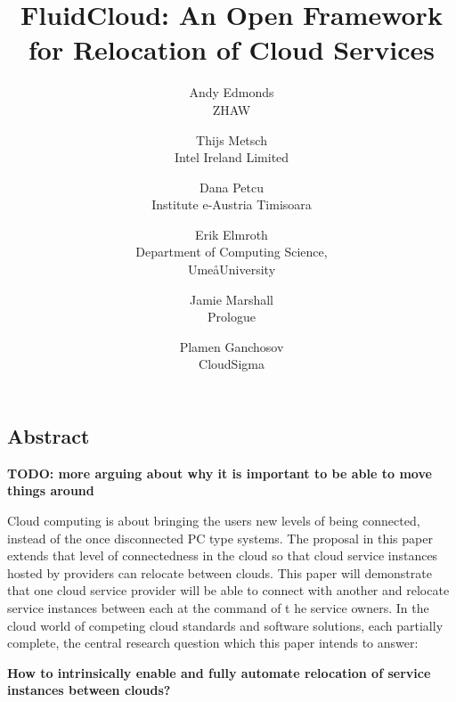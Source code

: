 \documentclass[letterpaper,twocolumn,10pt]{article}
\begin{document}
\date{}

\title{\Large \bf FluidCloud: An Open Framework for Relocation of Cloud Services}

\author{
{\rm Andy Edmonds}\\
ZHAW
\and
{\rm Thijs Metsch}\\
Intel Ireland Limited
\and
{\rm Dana Petcu}\\
Institute e-Austria Timisoara
\and
{\rm Erik Elmroth}\\
Department of Computing Science,\\Ume\aa  University
\and
{\rm Jamie Marshall}\\
Prologue
\and
{\rm Plamen Ganchosov}\\
CloudSigma
}

\maketitle


\subsection*{Abstract}

\textbf{TODO: more arguing about why it is important to be able to move things around}

Cloud computing is about bringing the users new levels of being connected, 
instead of the once disconnected PC type systems. The proposal in this paper extends 
that level of connectedness in the cloud so that cloud service instances 
hosted by providers can relocate between clouds. This paper will 
demonstrate that one cloud service provider will be able to connect with 
another and relocate service instances between each at the command of t
he service owners. In the cloud world of competing cloud standards and 
software solutions, each partially complete, the central research question which this paper intends to answer:

\textbf{How to intrinsically enable and fully automate relocation of service instances between clouds?}
\end{document}
